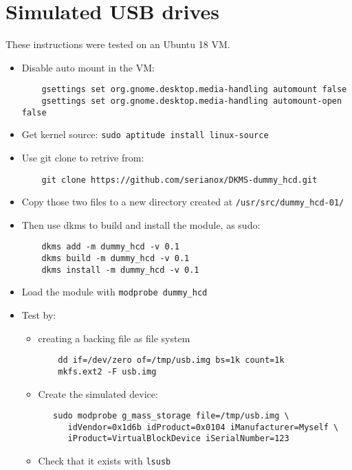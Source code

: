 \documentclass[12pt]{article}
\begin{document}
\section{Simulated USB drives}
These instructions were tested on an Ubuntu 18 VM.
\begin{itemize}
\item Disable auto mount in the VM:
\begin{verbatim}
    gsettings set org.gnome.desktop.media-handling automount false
    gsettings set org.gnome.desktop.media-handling automount-open false 
\end{verbatim}

\item Get kernel source: {\tt sudo aptitude install linux-source}

\item Use git clone to retrive from: 
\begin{verbatim}
    git clone https://github.com/serianox/DKMS-dummy_hcd.git
\end{verbatim}
\item Copy those two files to a new directory created at {\tt /usr/src/dummy\_hcd-01/}

\item Then use dkms to build and install the module, as sudo:
\begin{verbatim}
    dkms add -m dummy_hcd -v 0.1
    dkms build -m dummy_hcd -v 0.1
    dkms install -m dummy_hcd -v 0.1
\end{verbatim}

\item Load the module with {\tt modprobe dummy\_hcd}

\item Test by: 
\begin{itemize}

\item creating a backing file as file system
\begin{verbatim}
    dd if=/dev/zero of=/tmp/usb.img bs=1k count=1k
    mkfs.ext2 -F usb.img
\end{verbatim}

\item Create the simulated device:
\begin{verbatim}
   sudo modprobe g_mass_storage file=/tmp/usb.img \
      idVendor=0x1d6b idProduct=0x0104 iManufacturer=Myself \
      iProduct=VirtualBlockDevice iSerialNumber=123
\end{verbatim}

\item Check that it exists with {\tt lsusb}


\end{itemize}
\end{itemize}
\end{document}
